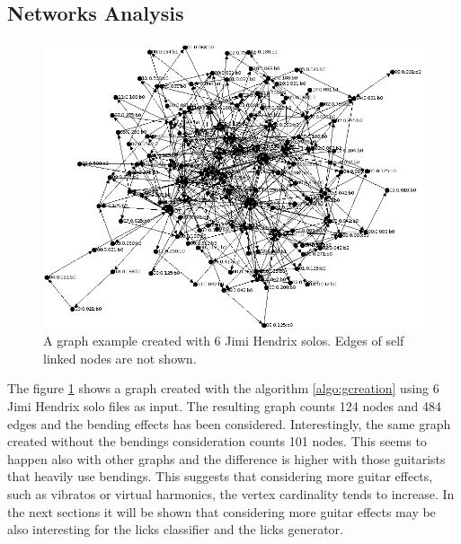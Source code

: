 \documentclass{llncs}
\begin{document}
\subsection{Networks Analysis}
\begin{figure}[H]
\centering
\includegraphics[scale=0.43]{hendrix_graph.png}
\caption{A graph example created with 6 Jimi Hendrix
solos. Edges of self linked nodes are not shown.}
\label{fig:hendrixgraph}
\end{figure}
The figure \ref{fig:hendrixgraph} shows a graph created with the
algorithm \ref{algo:gcreation} using 6 Jimi Hendrix solo files as input.
The resulting graph counts 124 nodes and 484 edges and the bending
effects has been considered. Interestingly, the same graph created
without the bendings consideration counts 101 nodes. This seems to
happen also with other graphs and the difference is higher with those
guitarists that heavily use bendings. This suggests that 
considering more 
guitar effects, such as vibratos or virtual harmonics, 
the vertex cardinality tends to increase. In the next
sections it will be shown that considering more guitar effects may be 
also interesting for the
licks classifier and the licks generator.
\end{document}
